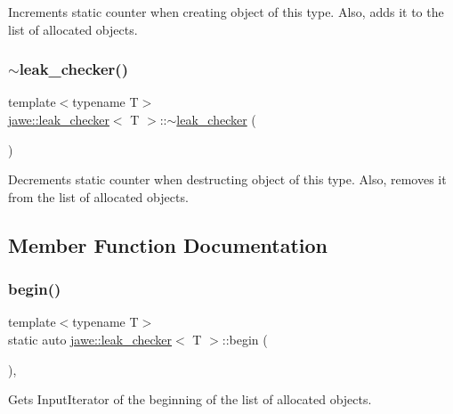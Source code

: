 Increments static counter when creating object of this type. Also, adds it to the list of allocated objects. \mbox{\label{classjawe_1_1leak__checker_a82dc4d60c3bdbf595794f6fe71c2933a}} 
\subsubsection{\texorpdfstring{$\sim$leak\+\_\+checker()}{~leak\_checker()}}
{\footnotesize\ttfamily template$<$typename T$>$ \\
\hyperlink{classjawe_1_1leak__checker}{jawe\+::leak\+\_\+checker}$<$ T $>$\+::$\sim$\hyperlink{classjawe_1_1leak__checker}{leak\+\_\+checker} (\begin{DoxyParamCaption}{ }\end{DoxyParamCaption})\hspace{0.3cm}{\ttfamily [inline]}}

Decrements static counter when destructing object of this type. Also, removes it from the list of allocated objects. 

\subsection{Member Function Documentation}
\mbox{\label{classjawe_1_1leak__checker_aa1b307208670036715f462d0d8cc1b2a}} 
\subsubsection{\texorpdfstring{begin()}{begin()}}
{\footnotesize\ttfamily template$<$typename T$>$ \\
static auto \hyperlink{classjawe_1_1leak__checker}{jawe\+::leak\+\_\+checker}$<$ T $>$\+::begin (\begin{DoxyParamCaption}{ }\end{DoxyParamCaption})\hspace{0.3cm}{\ttfamily [inline]}, {\ttfamily [static]}}

Gets Input\+Iterator of the beginning of the list of allocated objects. \mbox{\label{classjawe_1_1leak__checker_aaa7b847a4c0cf79589c8c66931967992}} 
